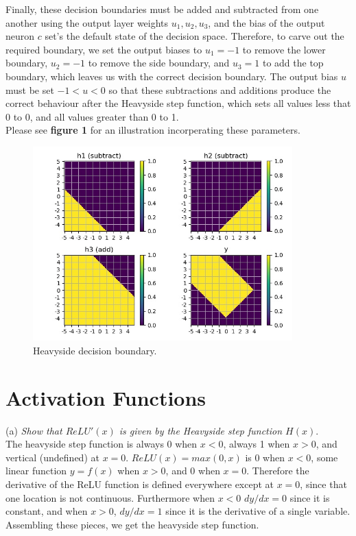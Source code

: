 \documentclass{amsart}
\theoremstyle{definition}
\theoremstyle{remark}
\numberwithin{equation}{section}
\begin{document}
Finally, these decision boundaries must be added and subtracted from one another
using the output layer weights ${u_1, u_2, u_3}$, and the bias of the output
neuron $c$ set's the default state of the decision space. Therefore, to carve
out the required boundary, we set the output biases to ${u_1 = -1}$ to remove
the lower boundary, ${u_2 = -1}$ to remove the side boundary, and ${u_3 = 1}$ to
 add the top boundary, which leaves us with the correct decision boundary. The
output bias ${u}$ must be set $-1 < u < 0$ so that these subtractions and
additions produce the correct behaviour after the Heavyside step function, which
sets all values less that 0 to 0, and all values greater than 0 to 1. \\

Please see \textbf{figure 1} for an illustration incorperating these parameters.
\begin{figure}[h]
\includegraphics[width=100mm]{heavyside_decision_boundary}
\caption{Heavyside decision boundary.}
\label{Figure 1}
\end{figure}


\section{Activation Functions}

(a) \textit{Show that $ReLU'(x)$ is given by the Heavyside step function $H(x)$}.\\

The heavyside step function is always 0 when $x < 0$, always 1 when $x > 0$,
and vertical (undefined) at $x = 0$. $ReLU(x) = max(0, x)$ is 0 when $x < 0$,
some linear function $y = f(x)$ when $x > 0$, and 0 when $x = 0$. Therefore the
derivative of the ReLU function is defined everywhere except at $x = 0$, since
that one location is not continuous. Furthermore when $x < 0$ $dy/dx = 0$ since
it is constant, and when $x > 0$, $dy/dx = 1$ since it is the derivative of a
single variable. Assembling these pieces, we get the heavyside step function. \\
\end{document}
